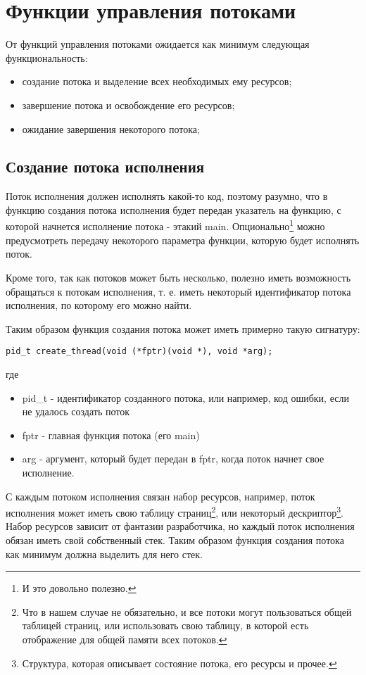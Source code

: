 \section{Функции управления потоками}

От функций управления потоками ожидается как минимум следующая функциональность:
\begin{itemize}
  \item создание потока и выделение всех необходимых ему ресурсов;
  \item завершение потока и освобождение его ресурсов;
  \item ожидание завершения некоторого потока;
\end{itemize}

\subsection{Создание потока исполнения}

Поток исполнения должен исполнять какой-то код, поэтому разумно, что в функцию
создания потока исполнения будет передан указатель на функцию, с которой
начнется исполнение потока - этакий main. Опционально\footnote{И это довольно
полезно.} можно предусмотреть передачу некоторого параметра функции, которую
будет исполнять поток.

Кроме того, так как потоков может быть несколько, полезно иметь возможность
обращаться к потокам исполнения, т. е. иметь некоторый идентификатор потока
исполнения, по которому его можно найти.

Таким образом функция создания потока может иметь примерно такую сигнатуру:

\begin{verbatim}
pid_t create_thread(void (*fptr)(void *), void *arg);
\end{verbatim}

где
\begin{itemize}
  \item pid\_t - идентификатор созданного потока, или например, код ошибки, если
        не удалось создать поток
  \item fptr - главная функция потока (его main)
  \item arg - аргумент, который будет передан в fptr, когда поток начнет свое
        исполнение.
\end{itemize}

С каждым потоком исполнения связан набор ресурсов, например, поток исполнения
может иметь свою таблицу страниц\footnote{Что в нашем случае не обязательно, и
все потоки могут пользоваться общей таблицей страниц, или использовать свою
таблицу, в которой есть отображение для общей памяти всех потоков.}, или
некоторый дескриптор\footnote{Структура, которая описывает состояние потока, его
ресурсы и прочее.}. Набор ресурсов зависит от фантазии разработчика, но каждый
поток исполнения обязан иметь свой собственный стек. Таким образом функция
создания потока как минимум должна выделить для него стек.

